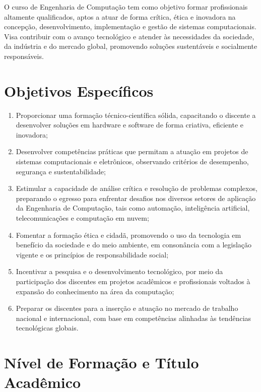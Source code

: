 O curso de Engenharia de Computação tem como objetivo formar profissionais altamente qualificados, aptos a atuar de forma crítica, ética e inovadora na concepção, desenvolvimento, implementação e gestão de sistemas computacionais. Visa contribuir com o avanço tecnológico e atender às necessidades da sociedade, da indústria e do mercado global, promovendo soluções sustentáveis e socialmente responsáveis.

\section{Objetivos Específicos}

\begin{enumerate}
    \item Proporcionar uma formação técnico-científica sólida, capacitando o discente a desenvolver soluções em hardware e software de forma criativa, eficiente e inovadora;

    \item Desenvolver competências práticas que permitam a atuação em projetos de sistemas computacionais e eletrônicos, observando critérios de desempenho, segurança e sustentabilidade;

    \item Estimular a capacidade de análise crítica e resolução de problemas complexos, preparando o egresso para enfrentar desafios nos diversos setores de aplicação da Engenharia de Computação, tais como automação, inteligência artificial, telecomunicações e computação em nuvem;

    \item Fomentar a formação ética e cidadã, promovendo o uso da tecnologia em benefício da sociedade e do meio ambiente, em consonância com a legislação vigente e os princípios de responsabilidade social;

    \item Incentivar a pesquisa e o desenvolvimento tecnológico, por meio da participação dos discentes em projetos acadêmicos e profissionais voltados à expansão do conhecimento na área da computação;

    \item Preparar os discentes para a inserção e atuação no mercado de trabalho nacional e internacional, com base em competências alinhadas às tendências tecnológicas globais.
\end{enumerate}

\section{Nível de Formação e Título Acadêmico}

